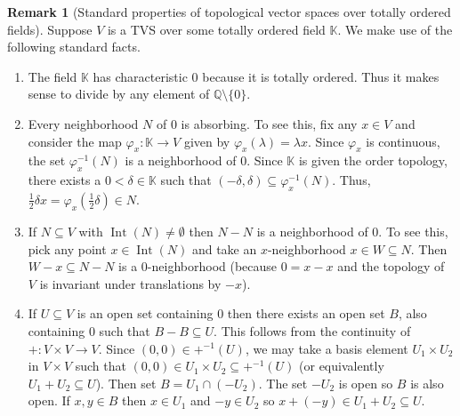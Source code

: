 \documentclass[a4paper,11pt]{article}
\numberwithin{equation}{section}
\theoremstyle{definition}
\newtheorem{Remark}[Definition]{Remark}
\theoremstyle{plain}
\DeclareMathOperator{\Int}{Int}
\let\phi\varphi
\begin{document}
\begin{Remark}[Standard properties of topological vector spaces over totally ordered fields]\label{Rem: Standard properties of TVSs}
    Suppose $V$ is a TVS over some totally ordered field $\mathbb{K}$. 
    We make use of the following standard facts. 
    \begin{enumerate}
        \item The field $\mathbb{K}$ has characteristic $0$ because it is totally ordered. Thus it makes sense to divide by any element of $\mathbb{Q}\setminus\{0\}$.
        \item Every neighborhood $N$ of $0$ is absorbing. To see this, fix any $x \in V$ and consider the map $\phi_{x}: \mathbb{K} \longrightarrow V$ given by $\phi_{x}(\lambda) = \lambda x$. Since $\phi_{x}$ is continuous, the set $\phi_{x}^{-1}(N)$ is a neighborhood of $0$. Since $\mathbb{K}$ is given the order topology, there exists a $0 < \delta \in \mathbb{K}$ such that $(-\delta, \delta) \subseteq \phi_{x}^{-1}(N)$. Thus, $\frac{1}{2}\delta x = \phi_{x}(\frac{1}{2} \delta) \in N$. 
        \item If $N \subseteq V$ with $\Int(N) \neq \emptyset$ then $N - N$ is a neighborhood of $0$. To see this, pick any point $x \in \Int(N)$ and take an $x$-neighborhood $x \in W \subseteq N$. Then $W - x \subseteq N - N$ is a $0$-neighborhood (because $0 = x - x$ and the topology of $V$ is invariant under translations by $-x$).
        \item If $U \subseteq V$ is an open set containing $0$ then there exists an open set $B$, also containing $0$ such that $B - B \subseteq U$. This follows from the continuity of $+: V \times V \longrightarrow V$. Since $(0, 0) \in +^{-1}(U)$, we may take a basis element $U_{1} \times U_{2}$ in $V \times V$ such that $(0, 0) \in U_{1} \times U_{2} \subseteq +^{-1}(U)$ (or equivalently $U_{1} + U_{2} \subseteq U$). Then set $B = U_{1} \cap (-U_{2})$. The set $-U_{2}$ is open so $B$ is also open. If $x, y \in B$ then $x \in U_{1}$ and $-y \in U_{2}$ so $x + (-y) \in U_{1} + U_{2} \subseteq U$.
    \end{enumerate}
\end{Remark}
\end{document}
